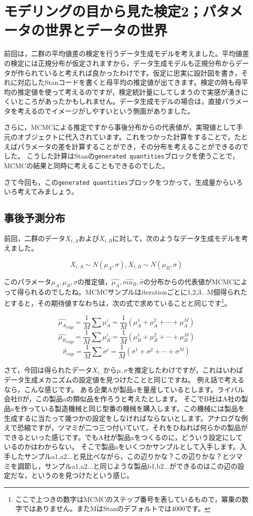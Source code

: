 \documentclass{ltjsbook}
\begin{document}
 
\chapter{モデリングの目から見た検定2；パタメータの世界とデータの世界}
\label{chapter20} 
前回は，二群の平均値差の検定を行うデータ生成モデルを考えました。平均値差の検定には正規分布が仮定されますから，データ生成モデルも正規分布からデータが作られていると考えれば良かったわけです。仮定に忠実に設計図を書き，それに対応したStanコードを書くと母平均の推定値が出てきます。検定の時も母平均の推定値を使って考えるのですが，検定統計量にしてしまうので実感が湧きにくいところがあったかもしれません。データ生成モデルの場合は，直接パラメータを考えるのでイメージがしやすいという側面がありました。

さらに，MCMCによる推定ですから事後分布からの代表値が，実現値として手元のオブジェクトに代入されています。これをつかった計算をすることで，たとえばパラメータの差を計算することができ，その分布を考えることができるのでした。
こうした計算はStanの\texttt{generated quantities}ブロックを使うことで，MCMCの結果と同時に考えることもできるのでした。

さて今回も，この\texttt{generated quantities}ブロックをつかって，生成量からいろいろ考えてみましょう。
\section{事後予測分布}
前回，二群のデータ$X_{i,A}$および$X_{i,B}$に対して，次のようなデータ生成モデルを考えました。

$$ X_{i,A} \sim N(\mu_A,\sigma), X_{i,B} \sim N(\mu_B,\sigma) $$

このパラメータ$\mu_A,\mu_B,\sigma$の推定値，$\hat{\mu_A},\hat{mu_B},\hat{\sigma}$の分布からの代表値がMCMCによって得られるのでしたね。MCMCサンプルはiterationごとに1,2,3...M個得られたとすると，その期待値すなわちは，次の式で求めていることと同じです\footnote{ここで上つきの数字はMCMCのステップ番号を表しているもので，冪乗の数字ではありません。またMはStanのデフォルトでは4000です。}。

$$ \hat{\mu_A}_{eap} = \frac{1}{M}\sum \mu_A^i = \frac{1}{M}(\mu_A^1+\mu_A^2+\cdots+\mu_A^M) $$
$$ \hat{\mu_B}_{eap} = \frac{1}{M}\sum \mu_B^i = \frac{1}{M}(\mu_B^1+\mu_B^2+\cdots+\mu_B^M) $$
$$ \hat{\sigma}_{eap} = \frac{1}{M}\sum \sigma^i = \frac{1}{M}(\sigma^1+\sigma^2+\cdots+\sigma^M) $$

さて，今回は得られたデータ$X_{i,.}$から$\mu,\sigma$を推定したわけですが，これはいわばデータ生成メカニズムの設定値を見つけたことと同じですね。
例え話で考えるなら，こんな感じです。
ある企業Aが製品aを量産しているとします。ライバル会社Bが，この製品aの類似品を作ろうと考えたとします。
そこでB社はA社の製品aを作っている製造機械と同じ型番の機械を購入します。この機械には製品を生成するに当たって幾つかの設定をしなければならないとします。アナログな例えで恐縮ですが，ツマミが二つ三つ付いていて，それをひねれば何らかの製品ができるといった感じです。でもA社が製品aをつくるのに，どういう設定にしているのかはわからない。
そこで製品aをいくつかサンプルとして入手します。入手したサンプルa1,a2...と見比べながら，この辺りかな？この辺りかな？とツマミを調節し，サンプルa1,a2...と同じような製品b1,b2...ができるのはこの辺の設定だな，というのを見つけたという感じ。
\end{document}

